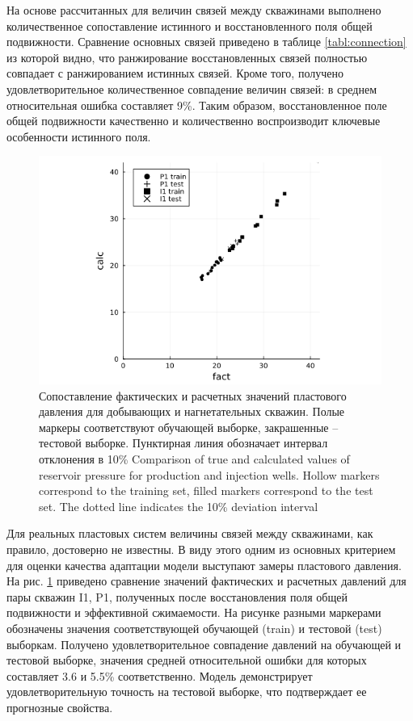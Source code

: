 \documentclass{article}
\begin{document}
 На основе рассчитанных для величин связей между скважинами выполнено количественное сопоставление истинного и восстановленного поля общей подвижности. Сравнение основных связей приведено в таблице \ref{tabl:connection} из которой видно, что ранжирование восстановленных связей полностью совпадает с ранжированием истинных связей. Кроме того, получено удовлетворительное количественное совпадение величин связей: в среднем относительная ошибка составляет 9\%. Таким образом, восстановленное поле общей подвижности качественно и количественно воспроизводит ключевые особенности истинного поля.

\begin{figure}
	\centering
	\includegraphics[width=0.7\linewidth]{fig6}
	\caption{Сопоставление фактических и расчетных значений пластового давления для добывающих и нагнетательных скважин. Полые маркеры соответствуют обучающей выборке, закрашенные – тестовой выборке. Пунктирная линия обозначает интервал отклонения в 10\% Comparison of true and calculated values of reservoir pressure for production and injection wells. Hollow markers correspond to the training set, filled markers correspond to the test set. The dotted line indicates the 10\% deviation interval}
	\label{fig:cp}
\end{figure}

Для реальных пластовых систем величины связей между скважинами, как правило, достоверно не известны. В виду этого одним из основных критерием для оценки качества адаптации модели выступают замеры пластового давления. На рис. \ref{fig:cp} приведено сравнение значений фактических и расчетных давлений для пары скважин I1, P1, полученных после восстановления поля общей подвижности и эффективной сжимаемости. На рисунке разными маркерами обозначены значения соответствующей обучающей (train) и тестовой (test) выборкам. Получено удовлетворительное совпадение давлений на обучающей и тестовой выборке, значения средней относительной ошибки для которых составляет 3.6 и 5.5\% соответственно. Модель демонстрирует удовлетворительную точность на тестовой выборке, что подтверждает ее прогнозные свойства.
\end{document}
